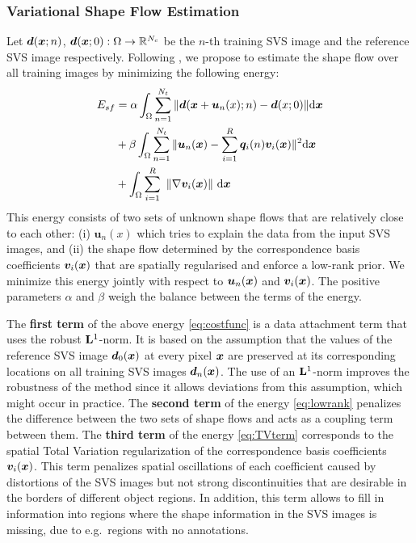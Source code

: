 \subsubsection*{Variational Shape Flow Estimation}%
\label{varshapeflow}


Let $\bm{d}(\boldsymbol{x};n)$, $\bm{d}(\boldsymbol{x};0):\Omega\rightarrow \mathbb{R}^{N_c}$ be the $n$-th training SVS image and the reference SVS image respectively. Following \cite{Garg:2013hu}, we propose to estimate the shape flow over all training images by minimizing the following energy:
\begin{align}
E_{sf} & =\alpha
\int_{\Omega}\sum_{n=1}^{N_t} \|\bm{d}(\boldsymbol{x}+\bm{u}_n(x);n)-\bm{d}(x;0)\| \mathrm{d} \boldsymbol{x} \label{eq:costfunc}\\
    &+ \beta \int_{\Omega}\sum_{n=1}^{N_t}\|\bm{u}_n(\boldsymbol{x})-\sum_{i=1}^R\bm{q}_i(n)\bm{v}_i(\boldsymbol{x})\|^2 \mathrm{d} \boldsymbol{x} \label{eq:lowrank}\\
    &+
\int_\Omega  \sum_{i=1}^R \,\, \left \|    \nabla \bm{v}_i(\boldsymbol{x})    \right \|  \,\mathrm{d} \boldsymbol{x} \label{eq:TVterm}
\end{align}
This energy consists of two sets of unknown shape flows that are relatively close to each other: (i) $\bm{u}_n(x)$ which tries to explain the data from the input SVS images, and (ii) the shape flow determined by the correspondence basis coefficients $\bm{v}_i(\boldsymbol{x})$ that are spatially regularised and enforce a low-rank prior. We minimize this energy jointly with respect to $\bm{u}_n(\boldsymbol{x})$ and $\bm{v}_i(\boldsymbol{x})$. The positive parameters $\alpha$ and $\beta$ weigh the balance between the terms of the energy.

The \textbf{first term} of the above energy \eqref{eq:costfunc} is a data attachment term
that uses the robust $\mathbf{L}^1$-norm.  It is based on the assumption that the values of the reference SVS image $\bm{d}_0(\boldsymbol{x})$ at every pixel $\boldsymbol{x}$ are preserved at its corresponding locations on all training SVS images $\bm{d}_n(\boldsymbol{x})$. The use of an $\mathbf{L}^1$-norm improves the robustness of the method since it allows deviations from this assumption, which might occur in practice.
The \textbf{second term} of the energy \eqref{eq:lowrank} penalizes the difference between the two sets  of shape flows and acts as a coupling term between them.
The \textbf{third term} of the energy \eqref{eq:TVterm} corresponds to the spatial Total Variation regularization \cite{rudin92} of
the correspondence basis coefficients $\bm{v}_i(\boldsymbol{x})$.
This term penalizes spatial oscillations of each coefficient caused by distortions of the SVS images but not strong discontinuities that are desirable in the borders of different object regions. In addition, this term allows to fill in information into regions where the shape information in the SVS images is missing, due to e.g.~regions with no annotations.

